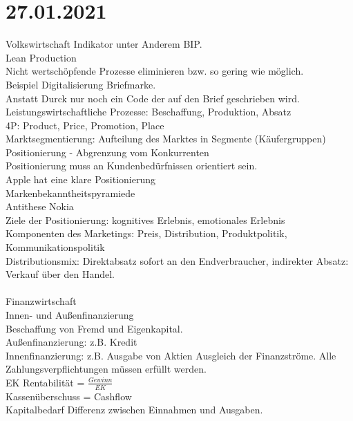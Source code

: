 \documentclass{article}
\begin{document}
	\section*{27.01.2021}
	Volkswirtschaft Indikator unter Anderem BIP. \\
	Lean Production \\
	Nicht wertschöpfende Prozesse eliminieren bzw. so gering wie möglich. \\
	Beispiel Digitalisierung Briefmarke. \\
	Anstatt Durck nur noch ein Code der auf den Brief geschrieben wird. \\
	Leistungswirtschaftliche Prozesse: Beschaffung, Produktion, Absatz \\
	4P: Product, Price, Promotion, Place \\
	Marktsegmentierung: Aufteilung des Marktes in Segmente (Käufergruppen) \\
	Positionierung - Abgrenzung vom Konkurrenten \\
	Positionierung muss an Kundenbedürfnissen orientiert sein. \\
	Apple hat eine klare Positionierung \\
	Markenbekanntheitspyramiede \\
	Antithese Nokia \\
	Ziele der Positionierung: kognitives Erlebnis, emotionales Erlebnis \\
	Komponenten des Marketings: Preis, Distribution, Produktpolitik, Kommunikationspolitik \\
	Distributionsmix: Direktabsatz sofort an den Endverbraucher, indirekter Absatz: Verkauf über den Handel. \\
	\\
	Finanzwirtschaft \\
	Innen- und Außenfinanzierung \\
	Beschaffung von Fremd und Eigenkapital. \\
	Außenfinanzierung: z.B. Kredit \\
	Innenfinanzierung: z.B. Ausgabe von Aktien
	Ausgleich der Finanzströme. Alle Zahlungsverpflichtungen müssen erfüllt werden. \\
	EK Rentabilität = $\frac{Gewinn}{EK}$ \\
	Kassenüberschuss = Cashflow \\
	Kapitalbedarf Differenz zwischen Einnahmen und Ausgaben. \\
\end{document}
